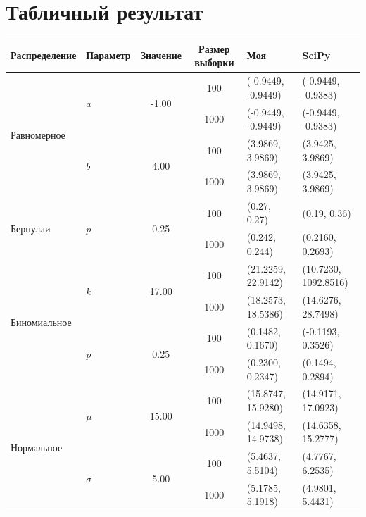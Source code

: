 \documentclass[a4paper,14pt]{extarticle}
\begin{document}
    \section{Табличный результат}

    \begin{table}[ht!]
        \centering
        \smallskip
        \footnotesize
        \begin{tabular}{llcc p{3.5cm} p{3.5cm}}
            \toprule
            \textbf{Распределение} & \textbf{Параметр} & \textbf{Значение} & \textbf{Размер выборки} & \textbf{Моя} & \textbf{SciPy} \\
            \midrule
            \multirow{4}{*}{Равномерное} & \multirow{2}{*}{$a$} & \multirow{2}{*}{-1.00}    & 100 & (-0.9449, -0.9449) & (-0.9449, -0.9383) \\
                                                                                    & &     & 1000 & (-0.9449, -0.9449) & (-0.9449, -0.9383) \\
            \cmidrule{2-6}
            & \multirow{2}{*}{$b$} & \multirow{2}{*}{4.00}  & 100 & (3.9869, 3.9869) & (3.9425, 3.9869) \\
                                                        & & & 1000 & (3.9869, 3.9869) & (3.9425, 3.9869) \\
            \midrule
            \multirow{2}{*}{Бернулли} & \multirow{2}{*}{$p$} & \multirow{2}{*}{0.25}    & 100 & (0.27, 0.27) & (0.19, 0.36) \\
                                                                                & &     & 1000 & (0.242, 0.244) & (0.2160, 0.2693) \\
            \midrule
            \multirow{4}{*}{Биномиальное} & \multirow{2}{*}{$k$} & \multirow{2}{*}{17.00}   & 100 & (21.2259, 22.9142) & (10.7230, 1092.8516) \\
                                                                                    & &     & 1000 & (18.2573, 18.5386) & (14.6276, 28.7498) \\
            \cmidrule{2-6}
            & \multirow{2}{*}{$p$} & \multirow{2}{*}{0.25}  & 100 & (0.1482, 0.1670) & (-0.1193, 0.3526) \\
                                                        & & & 1000 & (0.2300, 0.2347) & (0.1494, 0.2894) \\
            \midrule
            \multirow{4}{*}{Нормальное} & \multirow{2}{*}{$\mu$} & \multirow{2}{*}{15.00}   & 100 & (15.8747, 15.9280) & (14.9171, 17.0923) \\
                                                                                    & &     & 1000 & (14.9498, 14.9738) & (14.6358, 15.2777) \\
            \cmidrule{2-6}
            & \multirow{2}{*}{$\sigma$} & \multirow{2}{*}{5.00}     & 100 & (5.4637, 5.5104) & (4.7767, 6.2535) \\
                                                            & &     & 1000 & (5.1785, 5.1918) & (4.9801, 5.4431) \\
            \bottomrule
        \end{tabular}
    \end{table}
\end{document}
